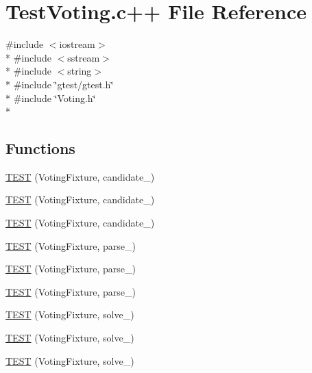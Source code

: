 \hypertarget{TestVoting_8c_09_09}{\section{Test\-Voting.\-c++ File Reference}
\label{TestVoting_8c_09_09}
}
{\ttfamily \#include $<$iostream$>$}\\*
{\ttfamily \#include $<$sstream$>$}\\*
{\ttfamily \#include $<$string$>$}\\*
{\ttfamily \#include \char`\"{}gtest/gtest.\-h\char`\"{}}\\*
{\ttfamily \#include \char`\"{}Voting.\-h\char`\"{}}\\*
\subsection*{Functions}
\begin{DoxyCompactItemize}
\item 
\hyperlink{TestVoting_8c_09_09_a38059f5dcb3b59cd055827d95b4024d4}{T\-E\-S\-T} (Voting\-Fixture, candidate\-\_)
\item 
\hyperlink{TestVoting_8c_09_09_a5f2495fb427898f73afa76d1dddc4c66}{T\-E\-S\-T} (Voting\-Fixture, candidate\-\_)
\item 
\hyperlink{TestVoting_8c_09_09_a3fbdb9272746066a85cd348885c54946}{T\-E\-S\-T} (Voting\-Fixture, candidate\-\_)
\item 
\hyperlink{TestVoting_8c_09_09_a15e24ef0fdd7937697932fc38af30407}{T\-E\-S\-T} (Voting\-Fixture, parse\-\_)
\item 
\hyperlink{TestVoting_8c_09_09_acb6ea59e52c6bc545c9dc0c1d2f0f1de}{T\-E\-S\-T} (Voting\-Fixture, parse\-\_)
\item 
\hyperlink{TestVoting_8c_09_09_a5825b6fb0aa3aaae9486464cd2980caf}{T\-E\-S\-T} (Voting\-Fixture, parse\-\_)
\item 
\hyperlink{TestVoting_8c_09_09_a4b03df1882fbdc57b33229a8c4f119e4}{T\-E\-S\-T} (Voting\-Fixture, solve\-\_)
\item 
\hyperlink{TestVoting_8c_09_09_a73e3b622e92564762d37a31446c48777}{T\-E\-S\-T} (Voting\-Fixture, solve\-\_)
\item 
\hyperlink{TestVoting_8c_09_09_a0c6fb1277778ab885a7e3811a32705a1}{T\-E\-S\-T} (Voting\-Fixture, solve\-\_)
\end{DoxyCompactItemize}


